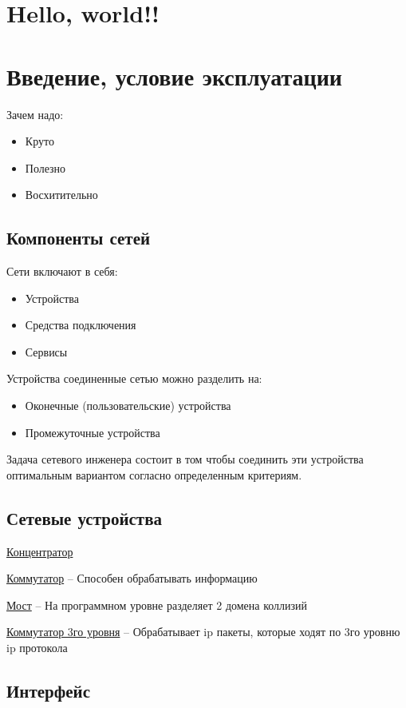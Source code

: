 \documentclass{article}
\begin{document}
\section{Hello, world!!}
\section{Введение, условие эксплуатации}

Зачем надо:
\begin{itemize}
	\item Круто
	\item Полезно
	\item Восхитительно
\end{itemize}

\subsection{Компоненты сетей}

Сети включают в себя:
\begin{itemize}
	\item Устройства
	\item Средства подключения
	\item Сервисы
\end{itemize}

Устройства соединенные сетью можно разделить на:
\begin{itemize}
	\item Оконечные (пользовательские) устройства
	\item Промежуточные устройства
\end{itemize}

Задача сетевого инженера состоит в том чтобы соединить эти устройства оптимальным вариантом
согласно определенным критериям.

\subsection{Сетевые устройства}

\underline{Концентратор} 

\underline{Коммутатор} -- Способен обрабатывать информацию

\underline{Мост} -- На программном уровне разделяет 2 домена коллизий

\underline{Коммутатор 3го уровня} -- Обрабатывает ip пакеты, которые ходят по 3го уровню ip протокола

\subsection{Интерфейс}
\end{document}
